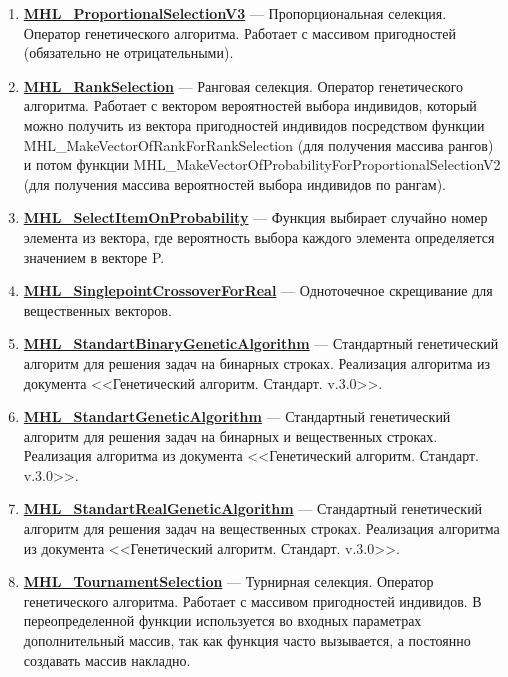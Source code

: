 \documentclass[a4paper,12pt]{article}
\begin{document}
\begin{enumerate}
\item \textbf{\hyperref[MHL_ProportionalSelectionV3]{MHL\_ProportionalSelectionV3}} --- Пропорциональная селекция. Оператор генетического алгоритма. Работает с массивом пригодностей (обязательно не отрицательными).

\item \textbf{\hyperref[MHL_RankSelection]{MHL\_RankSelection}} --- Ранговая селекция. Оператор генетического алгоритма. Работает с вектором вероятностей выбора индивидов, который можно получить из вектора пригодностей индивидов посредством функции MHL\_MakeVectorOfRankForRankSelection (для получения массива рангов) и потом функции MHL\_MakeVectorOfProbabilityForProportionalSelectionV2 (для получения массива вероятностей выбора индивидов по рангам).

\item \textbf{\hyperref[MHL_SelectItemOnProbability]{MHL\_SelectItemOnProbability}} --- Функция выбирает случайно номер элемента из вектора, где вероятность выбора каждого элемента определяется значением в векторе P.

\item \textbf{\hyperref[MHL_SinglepointCrossoverForReal]{MHL\_SinglepointCrossoverForReal}} --- Одноточечное скрещивание для вещественных векторов.

\item \textbf{\hyperref[MHL_StandartBinaryGeneticAlgorithm]{MHL\_StandartBinaryGeneticAlgorithm}} --- Стандартный генетический алгоритм для решения задач на бинарных строках. Реализация алгоритма из документа <<Генетический алгоритм. Стандарт. v.3.0>>.

\item \textbf{\hyperref[MHL_StandartGeneticAlgorithm]{MHL\_StandartGeneticAlgorithm}} --- Стандартный генетический алгоритм для решения задач на бинарных и вещественных строках. Реализация алгоритма из документа <<Генетический алгоритм. Стандарт. v.3.0>>.

\item \textbf{\hyperref[MHL_StandartRealGeneticAlgorithm]{MHL\_StandartRealGeneticAlgorithm}} --- Стандартный генетический алгоритм для решения задач на вещественных строках. Реализация алгоритма из документа <<Генетический алгоритм. Стандарт. v.3.0>>.

\item \textbf{\hyperref[MHL_TournamentSelection]{MHL\_TournamentSelection}} --- Турнирная селекция. Оператор генетического алгоритма. Работает с массивом пригодностей индивидов. В переопределенной функции используется во входных параметрах дополнительный массив, так как функция часто вызывается, а постоянно создавать массив накладно.


\end{enumerate}
\end{document}
